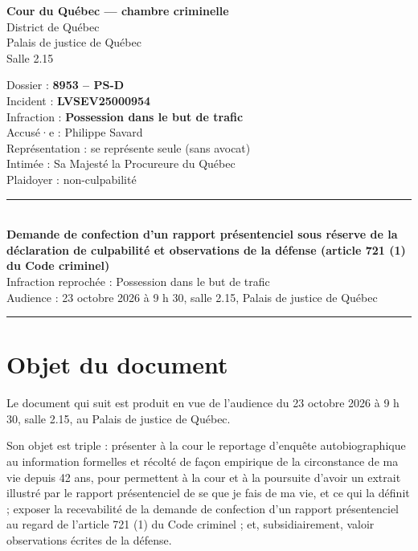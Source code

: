 \documentclass[12pt,a4paper]{article}
\begin{document}
\thispagestyle{empty}
\begin{minipage}[t]{0.60\textwidth}
\textbf{Cour du Québec — chambre criminelle}\\
District de Québec\\
Palais de justice de Québec\\
Salle 2.15
\end{minipage}\hfill
\begin{minipage}[t]{0.37\textwidth}
\raggedleft
Dossier : \textbf{8953 – PS-D}\\
Incident : \textbf{LVSEV25000954}\\
Infraction : \textbf{Possession dans le but de trafic}\\
Accusé·e : Philippe Savard\\
Représentation : se représente seule (sans avocat)\\
Intimée : Sa Majesté la Procureure du Québec\\
Plaidoyer : non-culpabilité
\end{minipage}
\vspace{0.8cm}
\begin{center}
\rule{\textwidth}{0.4pt}\\[0.4em]
\textbf{\large Demande de confection d'un rapport présentenciel sous réserve de la déclaration de culpabilité et observations de la défense (article 721 (1) du Code criminel)}\\[0.3em]
Infraction reprochée : Possession dans le but de trafic\\
Audience : 23 octobre 2026 à 9 h 30, salle 2.15, Palais de justice de Québec
\rule{\textwidth}{0.4pt}
\end{center}

\section{Objet du document}
Le document qui suit est produit en vue de l'audience du 23 octobre 2026 à 9 h 30, salle 2.15, au Palais de justice de Québec.

Son objet est triple : présenter à la cour le reportage d'enquête autobiographique au information formelles et récolté de façon empirique de la circonstance de ma vie depuis 42 ans, pour permettent à la cour et à la poursuite d'avoir un extrait illustré 
par le rapport présentenciel de se que je fais de ma vie, et ce qui la définit ; exposer la recevabilité de la demande de confection d'un rapport présentenciel au regard de l'article 721 (1) du Code criminel ; et, subsidiairement, valoir observations écrites de la défense.
\end{document}
